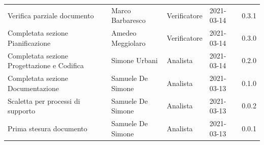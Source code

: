 \documentclass[a4paper]{article}
\begin{document}
\begin{center}
\begin{table}[h!]
\begin{tabular}{p{160px} p{90px} p{65px} p{60px} p{45px}}
            Verifica parziale documento                 & Marco Barbaresco                            & Verificatore   & 2021-03-14    & 0.3.1             \\
            Completata sezione Pianificazione           & Amedeo Meggiolaro                           & Verificatore   & 2021-03-14    & 0.3.0             \\
            Completata sezione Progettazione e Codifica & Simone Urbani                               & Analista       & 2021-03-14    & 0.2.0             \\
            Completata sezione Documentazione           & Samuele De Simone                           & Analista       & 2021-03-13    & 0.1.0             \\
            Scaletta per processi di supporto           & Samuele De Simone                           & Analista       & 2021-03-13    & 0.0.2             \\
            Prima stesura documento                     & Samuele De Simone                           & Analista       & 2021-03-13    & 0.0.1             \\
        \end{tabular}
    \end{table}
\end{center}
\newpage
\tableofcontents
\newpage





\end{document}

